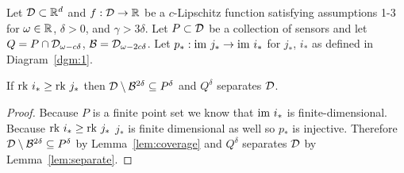 \begin{theorem}\label{thm:tcc}
    Let ${\mathcal{D}}\subset\mathbb{R}^d$ and $f:{\mathcal{D}}\to\mathbb{R}$ be a $c$-Lipschitz function satisfying assumptions 1-3 for $\omega\in\mathbb{R}$, $\delta > 0$, and $\gamma > 3\delta$.
    Let $P\subset{\mathcal{D}}$ be a collection of sensors and let $Q = P\cap {\mathcal{D}}_{\omega - c\delta}$, ${\mathcal{B}} = {\mathcal{D}}_{\omega - 2c\delta}$.
    Let $p_* : \mathrm{im}~j_*\to\mathrm{im}~i_*$ for $j_*$, $i_*$ as defined in Diagram~\ref{dgm:1}.

    If $\mathrm{rk}~i_*\geq \mathrm{rk}~j_*$ then ${\mathcal{D}}\setminus{\mathcal{B}}^{2\delta}\subseteq P^\delta$ and $Q^\delta$ separates ${\mathcal{D}}$.
\end{theorem}
\begin{proof}
    Because $P$ is a finite point set we know that $\mathrm{im}~i_*$ is finite-dimensional.
    Because $\mathrm{rk}~i_*\geq \mathrm{rk}~j_*$ $j_*$ is finite dimensional as well so $p_*$ is injective.
    Therefore ${\mathcal{D}}\setminus{\mathcal{B}}^{2\delta}\subseteq P^\delta$ by Lemma~\ref{lem:coverage} and $Q^\delta$ separates ${\mathcal{D}}$ by Lemma~\ref{lem:separate}.
\end{proof}

